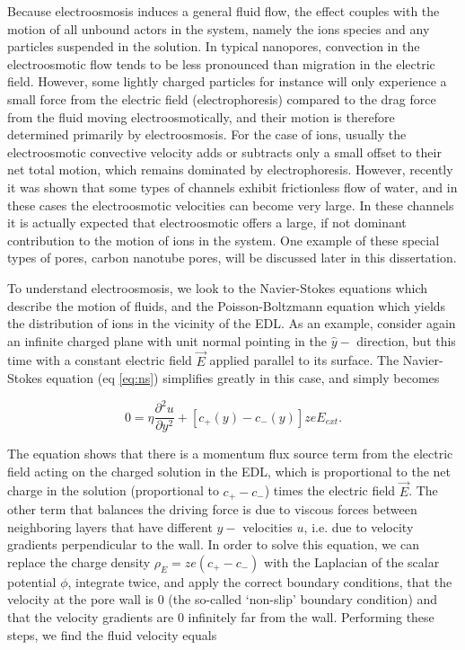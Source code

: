 			Because electroosmosis induces a general fluid flow, the effect couples with the motion of all unbound actors in the system, namely the ions species and any particles suspended in the solution. In typical nanopores, convection in the electroosmotic flow tends to be less pronounced than migration in the electric field. However, some lightly charged particles for instance will only experience a small force from the electric field (electrophoresis) compared to the drag force from the fluid moving electroosmotically, and their motion is therefore determined primarily by electroosmosis. For the case of ions, usually the electroosmotic convective velocity adds or subtracts only a small offset to their net total motion, which remains dominated by electrophoresis. However, recently it was shown that some types of channels exhibit frictionless flow of water, and in these cases the electroosmotic velocities can become very large. In these channels it is actually expected that electroosmotic offers a large, if not dominant contribution to the motion of ions in the system. One example of these special types of pores, carbon nanotube pores, will be discussed later in this dissertation.
			
			To understand electroosmosis, we look to the Navier-Stokes equations which describe the motion of fluids, and the Poisson-Boltzmann equation which yields the distribution of ions in the vicinity of the EDL. As an example, consider again an infinite charged plane with unit normal pointing in the $\hat{y}-$ direction, but this time with a constant electric field $\vec{E}$ applied parallel to its surface. The Navier-Stokes equation (eq \ref{eq:ns}) simplifies greatly in this case, and simply becomes
			
			\[ 0 = \eta\frac{\partial^{2}u}{\partial y^{2}}+\left[c_{+}\left(y\right)-c_{-}\left(y\right)\right]zeE_{ext}. \]
			
			The equation shows that there is a momentum flux source term from the electric field acting on the charged solution in the EDL, which is proportional to the net charge in the solution (proportional to $c_{+}-c_{-}$) times the electric field $\vec{E}$. The other term that balances the driving force is due to viscous forces between neighboring layers that have different $y-$ velocities $u$, i.e. due to velocity gradients perpendicular to the wall. In order to solve this equation, we can replace the charge density $\rho_{E}=ze\left(c_{+}-c_{-}\right)$ with the Laplacian of the scalar potential $\phi$, integrate twice, and apply the correct boundary conditions, that the velocity at the pore wall is 0 (the so-called `non-slip' boundary condition) and that the velocity gradients are 0 infinitely far from the wall.  Performing these steps, we find the fluid velocity equals 
			

